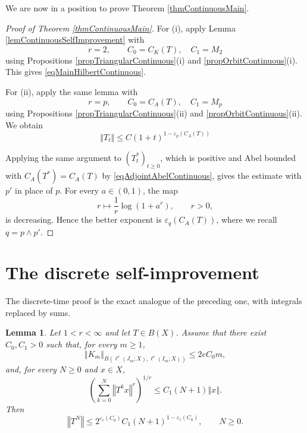 \documentclass[12pt]{amsart}
\theoremstyle{plain}
\newtheorem{lemma}[thm]{Lemma}
\theoremstyle{remark}
\theoremstyle{definition}
\newcommand{\norm}[1]{\left\Vert #1\right\Vert}
\begin{document}
	We are now in a position to prove Theorem \ref{thmContinuousMain}.
	\begin{proof}[Proof of Theorem \ref{thmContinuousMain}]
		For (i), apply Lemma \ref{lemContinuousSelfImprovement} with
		\[
		r=2,
		\qquad
		C_0=C_K(T), \quad C_1 = M_2
		\]
		using Propositions \ref{propTriangularContinuous}(i) and
		\ref{propOrbitContinuous}(i).  This gives
		\eqref{eqMainHilbertContinuous}.
		
		For (ii), apply the same lemma with
		\[
		r=p,
		\qquad
		C_0=C_A(T),\quad C_1 = M_p
		\]
		using Propositions \ref{propTriangularContinuous}(ii) and
		\ref{propOrbitContinuous}(ii).  We obtain \[
		\norm{T_t}
		\le
		C(1+t)^{1-\varepsilon_p(C_A(T))}\]
		
		Applying the same argument to $(T_t^*)_{t\ge0}$, which is positive and Abel bounded with $C_A(T^*)=C_A(T)$ by \eqref{eqAdjointAbelContinuous}, gives the estimate with $p'$ in place of
		$p$.  For every $a\in(0,1)$, the map
		\[
		r\longmapsto \frac1r\log(1+a^r),\qquad r>0,
		\]
		is decreasing.  Hence the better exponent is $\varepsilon_q(C_A(T))$, where we recall
		$q=p\wedge p'$. 
	\end{proof}
	
	
	
	\section{The discrete self-improvement}\label{secDiscrete}
	
	The discrete-time proof is the exact analogue of the preceding one, with
	integrals replaced by sums.
	
	\begin{lemma}\label{lemDiscreteSelfImprovement}
		Let $1<r<\infty$ and let $T\in B(X)$.  Assume that there exist $C_0,C_1>0$
		such that, for every $m\ge1$,
		\begin{equation*}\label{eqAbstractTriangularDiscrete}
			\norm{K_m}_{
				B(\ell^r(J_m;X),\ell^r(I_m;X))}
			\le
			2eC_0m,
		\end{equation*}
		and, for every $N\ge0$ and $x\in X$,
		\begin{equation*}\label{eqAbstractOrbitDiscrete}
			\left(\sum_{k=0}^{N}\norm{T^kx}^r\right)^{1/r}
			\le
			C_1(N+1)\norm{x}.
		\end{equation*}
		Then
		\begin{equation*}\label{eqAbstractConclusionDiscrete}
			\norm{T^N}
			\le
			2^{\varepsilon_r(C_0)}C_1(N+1)^{1-\varepsilon_r(C_0)},
			\qquad N\ge0.
		\end{equation*}
	\end{lemma}
	
\end{document}
